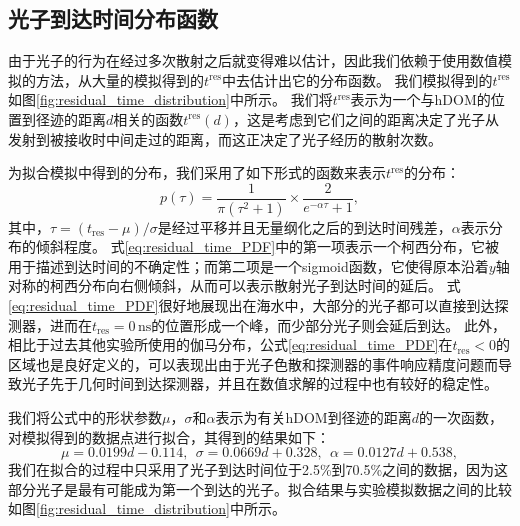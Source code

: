 \subsection{光子到达时间分布函数}

由于光子的行为在经过多次散射之后就变得难以估计，因此我们依赖于使用数值模拟的方法，从大量的模拟得到的$t^\mathrm{res}$中去估计出它的分布函数。
我们模拟得到的$t^\mathrm{res}$如图\ref{fig:residual_time_distribution}中所示。
我们将$t^\mathrm{res}$表示为一个与hDOM的位置到径迹的距离$d$相关的函数$t^\mathrm{res}(d)$，这是考虑到它们之间的距离决定了光子从发射到被接收时中间走过的距离，而这正决定了光子经历的散射次数。

为拟合模拟中得到的分布，我们采用了如下形式的函数来表示$t^\mathrm{res}$的分布：
\begin{equation}
    p(\tau) = \frac{1}{\pi (\tau^2+1)} \times \frac{2}{e^{-\alpha \tau} + 1} ,
    \label{eq:residual_time_PDF}
\end{equation}
其中，$\tau = (t_\mathrm{res} - \mu) / \sigma$是经过平移并且无量纲化之后的到达时间残差，$\alpha$表示分布的倾斜程度。
式\ref{eq:residual_time_PDF}中的第一项表示一个柯西分布，它被用于描述到达时间的不确定性；而第二项是一个sigmoid函数，它使得原本沿着$y$轴对称的柯西分布向右侧倾斜，从而可以表示散射光子到达时间的延后。
式\ref{eq:residual_time_PDF}很好地展现出在海水中，大部分的光子都可以直接到达探测器，进而在$t_\mathrm{res} = 0\,\mathrm{ns}$的位置形成一个峰，而少部分光子则会延后到达。
此外，相比于过去其他实验所使用的伽马分布\cite{AMANDA_track_reco:2003}，公式\ref{eq:residual_time_PDF}在$t_\mathrm{res} < 0$的区域也是良好定义的，可以表现出由于光子色散和探测器的事件响应精度问题而导致光子先于几何时间到达探测器，并且在数值求解的过程中也有较好的稳定性。

我们将公式中的形状参数$\mu$，$\sigma$和$\alpha$表示为有关hDOM到径迹的距离$d$的一次函数，对模拟得到的数据点进行拟合，其得到的结果如下：
\begin{equation}
    \mu = 0.0199 d - 0.114,~~
    \sigma = 0.0669 d + 0.328,~~
    \alpha = 0.0127 d + 0.538 ,
    \label{eq:residual_time_parameters}
\end{equation}
我们在拟合的过程中只采用了光子到达时间位于2.5\%到70.5\%之间的数据，因为这部分光子是最有可能成为第一个到达的光子。拟合结果与实验模拟数据之间的比较如图\ref{fig:residual_time_distribution}中所示。

